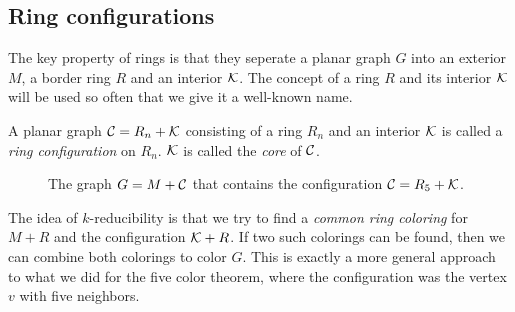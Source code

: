 \subsection{Ring configurations}

The key property of rings is that they seperate a planar graph $G$ into an exterior $M$, a border ring $R$ and an interior $\mathcal{K}$. The concept of a ring $R$ and its interior $\mathcal{K}$ will be used so often that we give it a well-known name.

\begin{definition}
    A planar graph $\mathcal{C} = R_n + \mathcal{K}$ consisting of a ring $R_n$ and an interior $\mathcal{K}$ is called a \emph{ring configuration} on $R_n$. $\mathcal{K}$ is called the \emph{core} of $\mathcal{C}$.
\end{definition}

\begin{figure}[!ht]
    \centering
    \caption{The graph $G=M + \mathcal{C}$ that contains the configuration $\mathcal{C}=R_5 + \mathcal{K}$.}
\end{figure}

The idea of $k$-reducibility is that we try to find a \textit{common ring coloring} for $M+R$ and the configuration $\mathcal{K}+R$. If two such colorings can be found, then we can combine both colorings to color $G$. This is exactly a more general approach to what we did for the five color theorem, where the configuration was the vertex $v$ with five neighbors.

